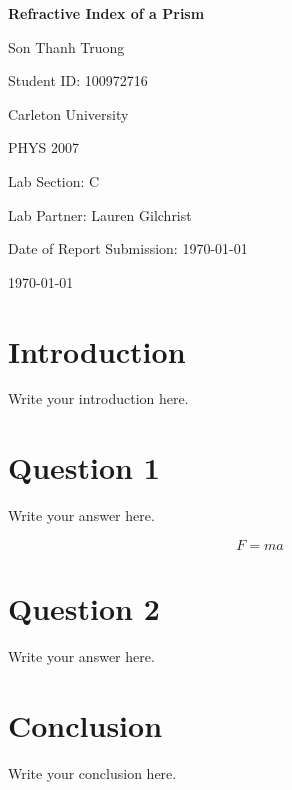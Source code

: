 \documentclass[12pt,letterpaper]{article}
\begin{document}
\begin{titlepage}
    \centering
    \vspace*{3cm}

    {\Huge\bfseries Refractive Index of a Prism\par}

    \vspace{2cm}

    {\Large Son Thanh Truong\par}
    {\Large Student ID: 100972716\par}
    \vspace{0.5cm}
    {\large Carleton University\par}
    {\large PHYS 2007\par}
    {\large Lab Section: C\par}
    {\large Lab Partner: Lauren Gilchrist\par}
    {\large Date of Report Submission: \today\par}
    
    
    \vfill

    {\large \today\par}
\end{titlepage}




\section{Introduction}

Write your introduction here.

\section{Question 1}

Write your answer here.

\begin{equation}
    F = ma
    \label{eq:newton}
\end{equation}

\section{Question 2}

Write your answer here.

%

\section{Conclusion}

Write your conclusion here.
\end{document}
